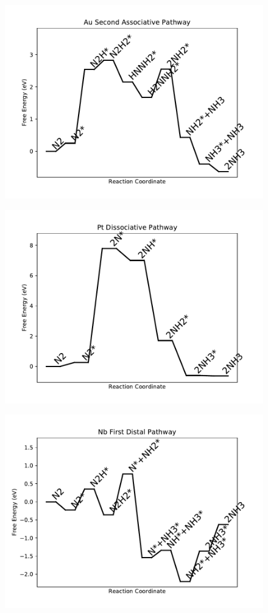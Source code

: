 \begin{figure}
\includegraphics[width=0.8\linewidth]{data/plots/Au_associative_2.pdf}
\label{fig:Au_associative_2}
\end{figure}

\begin{figure}
\includegraphics[width=0.8\linewidth]{data/plots/Pt_dissociative.pdf}
\label{fig:Pt_dissociative}
\end{figure}

\begin{figure}
\includegraphics[width=0.8\linewidth]{data/plots/Nb_distal_1.pdf}
\label{fig:Nb_distal_1}
\end{figure}

